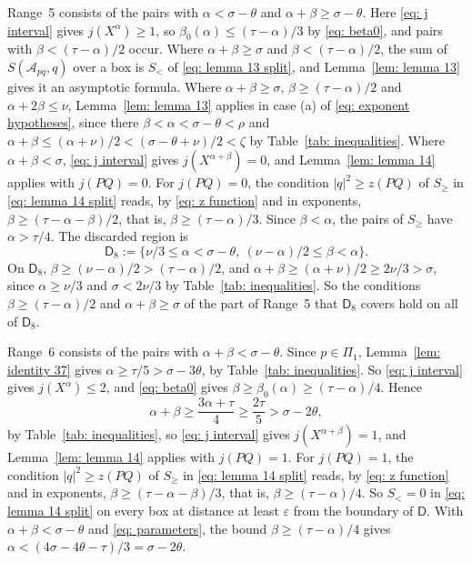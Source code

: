 \documentclass{article}
\numberwithin{equation}{section}
\newcommand{\Le}{\leqslant}
\newcommand{\Ge}{\geqslant}
\begin{document}
Range~5 consists of the pairs with $\alpha < \sigma - \theta$ and $\alpha + \beta \Ge \sigma - \theta$. Here \eqref{eq: j interval} gives $j(X^{\alpha}) \Ge 1$, so $\beta_0(\alpha) \Le (\tau - \alpha)/3$ by \eqref{eq: beta0}, and pairs with $\beta < (\tau - \alpha)/2$ occur. Where $\alpha + \beta \Ge \sigma$ and $\beta < (\tau - \alpha)/2$, the sum of $S(\mathcal{A}_{pq}, q)$ over a box is $S_<$ of \eqref{eq: lemma 13 split}, and Lemma~\ref{lem: lemma 13} gives it an asymptotic formula. Where $\alpha + \beta \Ge \sigma$, $\beta \Ge (\tau - \alpha)/2$ and $\alpha + 2\beta \Le \nu$, Lemma~\ref{lem: lemma 13} applies in case (a) of \eqref{eq: exponent hypotheses}, since there $\beta < \alpha < \sigma - \theta < \rho$ and $\alpha + \beta \Le (\alpha + \nu)/2 < (\sigma - \theta + \nu)/2 < \zeta$ by Table~\ref{tab: inequalities}. Where $\alpha + \beta < \sigma$, \eqref{eq: j interval} gives $j(X^{\alpha + \beta}) = 0$, and Lemma~\ref{lem: lemma 14} applies with $j(PQ) = 0$. For $j(PQ) = 0$, the condition $|q|^2 \Ge z(PQ)$ of $S_\Ge$ in \eqref{eq: lemma 14 split} reads, by \eqref{eq: z function} and in exponents, $\beta \Ge (\tau - \alpha - \beta)/2$, that is, $\beta \Ge (\tau - \alpha)/3$. Since $\beta < \alpha$, the pairs of $S_\Ge$ have $\alpha > \tau/4$. The discarded region is
\begin{equation}
\label{eq: D8}
\mathsf{D}_8 := \bigl\{ \nu/3 \Le \alpha < \sigma - \theta,\ (\nu - \alpha)/2 \Le \beta < \alpha \bigr\}.
\end{equation}
On $\mathsf{D}_8$, $\beta \Ge (\nu - \alpha)/2 > (\tau - \alpha)/2$, and $\alpha + \beta \Ge (\alpha + \nu)/2 \Ge 2\nu/3 > \sigma$, since $\alpha \Ge \nu/3$ and $\sigma < 2\nu/3$ by Table~\ref{tab: inequalities}. So the conditions $\beta \Ge (\tau - \alpha)/2$ and $\alpha + \beta \Ge \sigma$ of the part of Range~5 that $\mathsf{D}_8$ covers hold on all of $\mathsf{D}_8$.

Range~6 consists of the pairs with $\alpha + \beta < \sigma - \theta$. Since $p \in \Pi_1$, Lemma~\ref{lem: identity 37} gives $\alpha \Ge \tau/5 > \sigma - 3\theta$, by Table~\ref{tab: inequalities}. So \eqref{eq: j interval} gives $j(X^{\alpha}) \Le 2$, and \eqref{eq: beta0} gives $\beta \Ge \beta_0(\alpha) \Ge (\tau - \alpha)/4$. Hence
\begin{equation*}
\alpha + \beta \Ge \frac{3\alpha + \tau}{4} \Ge \frac{2\tau}{5} > \sigma - 2\theta,
\end{equation*}
by Table~\ref{tab: inequalities}, so \eqref{eq: j interval} gives $j(X^{\alpha + \beta}) = 1$, and Lemma~\ref{lem: lemma 14} applies with $j(PQ) = 1$. For $j(PQ) = 1$, the condition $|q|^2 \Ge z(PQ)$ of $S_\Ge$ in \eqref{eq: lemma 14 split} reads, by \eqref{eq: z function} and in exponents, $\beta \Ge (\tau - \alpha - \beta)/3$, that is, $\beta \Ge (\tau - \alpha)/4$. So $S_< = 0$ in \eqref{eq: lemma 14 split} on every box at distance at least $\varepsilon$ from the boundary of $\mathsf{D}$. With $\alpha + \beta < \sigma - \theta$ and \eqref{eq: parameters}, the bound $\beta \Ge (\tau - \alpha)/4$ gives $\alpha < (4\sigma - 4\theta - \tau)/3 = \sigma - 2\theta$.
\end{document}
